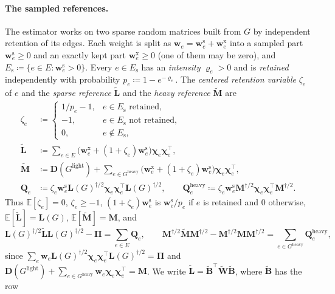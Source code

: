 \documentclass[11pt]{article}
\theoremstyle{remark}
\newcommand{\BB}{\mathbf B}
\newcommand{\BBtil}{{\widetilde{\BB}}}
\newcommand{\cchi}{{\boldsymbol\chi}}
\newcommand{\DD}{\mathbf D}
\newcommand{\LL}{\mathbf L}
\newcommand{\LLtil}{{\widetilde{\LL}}}
\newcommand{\MM}{\mathbf M}
\newcommand{\MMtil}{{\widetilde{\MM}}}
\newcommand{\PPi}{{\boldsymbol\Pi}}
\newcommand{\QQ}{\mathbf Q}
\newcommand{\ww}{\mathbf w}
\newcommand{\WW}{\mathbf W}
\newcommand{\WWtil}{{\widetilde{\WW}}}
\newcommand{\Gh}{G^{\mathrm{heavy}}}
\newcommand{\Gl}{G^{\mathrm{light}}}
\newcommand{\defeq}{\coloneqq}
\newcommand{\Ex}{\mathbb E}
\begin{document}
\paragraph{The sampled references.}
The estimator works on two sparse random matrices built from $G$ by
independent retention of its edges.
Each weight is split as $\ww_e=\ww^{\mathrm{s}}_e+\ww^{\mathrm{x}}_e$ into a
sampled part $\ww^{\mathrm{s}}_e\ge0$ and an exactly kept part
$\ww^{\mathrm{x}}_e\ge0$ (one of them may be zero), and
$E_{\mathrm{s}}\defeq\{e\in E:\ww^{\mathrm{s}}_e>0\}$.
Every $e\in E_{\mathrm{s}}$ has an \emph{intensity} $\varrho_e>0$ and is
\emph{retained} independently with probability $p_e\defeq1-e^{-\varrho_e}$.
The \emph{centered retention variable} $\zeta_e$ of $e$ and the
\emph{sparse reference} $\LLtil$ and the \emph{heavy reference} $\MMtil$ are
\begin{equation}\label{eq:references}
\begin{aligned}
\zeta_e&\defeq
\begin{cases}
1/p_e-1,&e\in E_{\mathrm{s}}\text{ retained},\\
-1,&e\in E_{\mathrm{s}}\text{ not retained},\\
0,&e\notin E_{\mathrm{s}},
\end{cases}\\
\LLtil&\defeq\sum_{e\in E}\bigl(\ww^{\mathrm{x}}_e+(1+\zeta_e)\ww^{\mathrm{s}}_e\bigr)\cchi_e\cchi_e^{\top},\\
\MMtil&\defeq\DD(\Gl)+\sum_{e\in\Gh}\bigl(\ww^{\mathrm{x}}_e+(1+\zeta_e)\ww^{\mathrm{s}}_e\bigr)\cchi_e\cchi_e^{\top},\\
\QQ_e&\defeq\zeta_e\ww^{\mathrm{s}}_e\LL(G)^{\dag/2}\cchi_e\cchi_e^{\top}\LL(G)^{\dag/2},
\qquad
\QQ^{\mathrm{heavy}}_e\defeq\zeta_e\ww^{\mathrm{s}}_e\MM^{\dag/2}\cchi_e\cchi_e^{\top}\MM^{\dag/2}.
\end{aligned}
\end{equation}
Thus $\Ex[\zeta_e]=0$, $\zeta_e\ge-1$, $(1+\zeta_e)\ww^{\mathrm{s}}_e$ is
$\ww^{\mathrm{s}}_e/p_e$ if $e$ is retained and $0$ otherwise,
$\Ex[\LLtil]=\LL(G)$, $\Ex[\MMtil]=\MM$, and
\begin{equation}\label{eq:deviations}
\LL(G)^{\dag/2}\LLtil\LL(G)^{\dag/2}-\PPi=\sum_{e\in E}\QQ_e,
\qquad
\MM^{\dag/2}\MMtil\MM^{\dag/2}-\MM^{\dag/2}\MM\MM^{\dag/2}=\sum_{e\in\Gh}\QQ^{\mathrm{heavy}}_e ,
\end{equation}
since $\sum_e\ww_e\LL(G)^{\dag/2}\cchi_e\cchi_e^{\top}\LL(G)^{\dag/2}=\PPi$ and
$\DD(\Gl)+\sum_{e\in\Gh}\ww_e\cchi_e\cchi_e^{\top}=\MM$.
We write $\LLtil=\BBtil^{\top}\WWtil\BBtil$, where $\BBtil$ has the row
\end{document}
